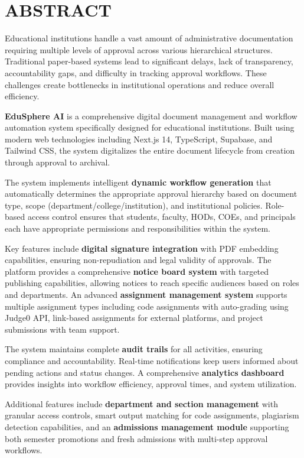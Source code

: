 \chapter*{ABSTRACT}

Educational institutions handle a vast amount of administrative documentation requiring multiple levels of approval across various hierarchical structures. Traditional paper-based systems lead to significant delays, lack of transparency, accountability gaps, and difficulty in tracking approval workflows. These challenges create bottlenecks in institutional operations and reduce overall efficiency.

\textbf{EduSphere AI} is a comprehensive digital document management and workflow automation system specifically designed for educational institutions. Built using modern web technologies including Next.js 14, TypeScript, Supabase, and Tailwind CSS, the system digitalizes the entire document lifecycle from creation through approval to archival.

The system implements intelligent \textbf{dynamic workflow generation} that automatically determines the appropriate approval hierarchy based on document type, scope (department/college/institution), and institutional policies. Role-based access control ensures that students, faculty, HODs, COEs, and principals each have appropriate permissions and responsibilities within the system.

Key features include \textbf{digital signature integration} with PDF embedding capabilities, ensuring non-repudiation and legal validity of approvals. The platform provides a comprehensive \textbf{notice board system} with targeted publishing capabilities, allowing notices to reach specific audiences based on roles and departments. An advanced \textbf{assignment management system} supports multiple assignment types including code assignments with auto-grading using Judge0 API, link-based assignments for external platforms, and project submissions with team support.

The system maintains complete \textbf{audit trails} for all activities, ensuring compliance and accountability. Real-time notifications keep users informed about pending actions and status changes. A comprehensive \textbf{analytics dashboard} provides insights into workflow efficiency, approval times, and system utilization.

Additional features include \textbf{department and section management} with granular access controls, smart output matching for code assignments, plagiarism detection capabilities, and an \textbf{admissions management module} supporting both semester promotions and fresh admissions with multi-step approval workflows.

